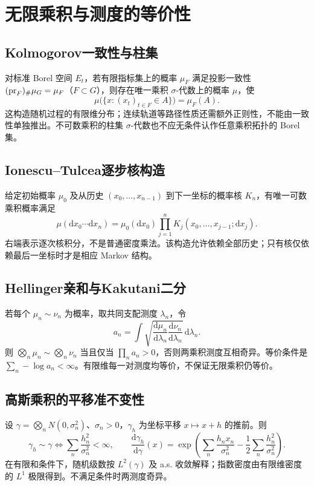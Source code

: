 \documentclass[../main.tex]{subfiles}
\begin{document}
\section{无限乘积与测度的等价性}
\subsection{Kolmogorov一致性与柱集}
对标准 Borel 空间 $E_t$，若有限指标集上的概率 $\mu_F$ 满足投影一致性 $({\rm pr}_F)_\#\mu_G=\mu_F$（$F\subset G$），则存在唯一乘积 $\sigma$-代数上的概率 $\mu$，使
\[
\mu\bigl(\{x:(x_t)_{t\in F}\in A\}\bigr)=\mu_F(A).
\]
这构造随机过程的有限维分布；连续轨道等路径性质还需额外正则性，不能由一致性单独推出。不可数乘积的柱集 $\sigma$-代数也不应无条件认作任意乘积拓扑的 Borel 集。
\subsection{Ionescu--Tulcea逐步核构造}
给定初始概率 $\mu_0$ 及从历史 $(x_0,\ldots,x_{n-1})$ 到下一坐标的概率核 $K_n$，有唯一可数乘积概率满足
\[
\mu(\mathrm dx_0\cdots\mathrm dx_n)
=\mu_0(\mathrm dx_0)\prod_{j=1}^nK_j(x_0,\ldots,x_{j-1};\mathrm dx_j).
\]
右端表示逐次核积分，不是普通密度乘法。该构造允许依赖全部历史；只有核仅依赖最后一坐标时才是相应 Markov 结构。
\subsection{Hellinger亲和与Kakutani二分}
若每个 $\mu_n\sim\nu_n$ 为概率，取共同支配测度 $\lambda_n$，令
\[
a_n=\int\sqrt{\frac{\mathrm d\mu_n}{\mathrm d\lambda_n}
\frac{\mathrm d\nu_n}{\mathrm d\lambda_n}}\,\mathrm d\lambda_n.
\]
则 $\bigotimes_n\mu_n\sim\bigotimes_n\nu_n$ 当且仅当 $\prod_na_n>0$，否则两乘积测度互相奇异。等价条件是 $\sum_n-\log a_n<\infty$。有限维每一对测度均等价，不保证无限乘积仍等价。
\subsection{高斯乘积的平移准不变性}
设 $\gamma=\bigotimes_nN(0,\sigma_n^2)$、$\sigma_n>0$，$\gamma_h$ 为坐标平移 $x\mapsto x+h$ 的推前。则
\[
\gamma_h\sim\gamma\iff\sum_n\frac{h_n^2}{\sigma_n^2}<\infty,
\qquad
\frac{\mathrm d\gamma_h}{\mathrm d\gamma}(x)
=\exp\left(\sum_n\frac{h_nx_n}{\sigma_n^2}-\frac12\sum_n\frac{h_n^2}{\sigma_n^2}\right).
\]
在有限和条件下，随机级数按 $L^2(\gamma)$ 及 a.s. 收敛解释；指数密度由有限维密度的 $L^1$ 极限得到。不满足条件时两测度奇异。
\end{document}
